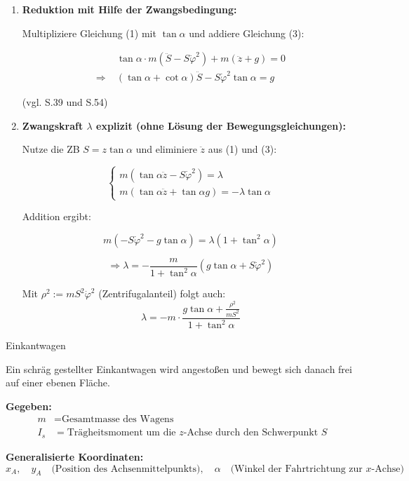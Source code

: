 \documentclass[10pt, letterpaper]{article}
\begin{document}
\begin{enumerate}[label=\textbf{\arabic*)}, itemsep=1.5em]
\item \textbf{Reduktion mit Hilfe der Zwangsbedingung:}

Multipliziere Gleichung (1) mit \( \tan\alpha \) und addiere Gleichung (3):

\begin{align*}
&\tan\alpha \cdot m(\ddot{S} - S \dot{\varphi}^2) + m(\ddot{z} + g) = 0 \\
\Rightarrow \; & (\tan\alpha + \cot\alpha) \ddot{S} - S \dot{\varphi}^2 \tan\alpha = g
\end{align*}

(vgl. S.39 und S.54)

\item \textbf{Zwangskraft \(\lambda\) explizit (ohne Lösung der Bewegungsgleichungen):}

Nutze die ZB \( S = z \tan\alpha \) und eliminiere \( \ddot{z} \) aus (1) und (3):

\[
\begin{cases}
m(\tan\alpha \ddot{z} - S \dot{\varphi}^2) = \lambda \\
m(\tan\alpha \ddot{z} + \tan\alpha g) = -\lambda \tan\alpha
\end{cases}
\]

Addition ergibt:

\[
m(-S \dot{\varphi}^2 - g \tan\alpha) = \lambda (1 + \tan^2\alpha)
\]

\[
\Rightarrow \lambda = -\frac{m}{1 + \tan^2\alpha} \left( g \tan\alpha + S \dot{\varphi}^2 \right)
\]

Mit \( \rho^2 := m S^2 \dot{\varphi}^2 \) (Zentrifugalanteil) folgt auch:
\[
\lambda = -m \cdot \frac{g \tan\alpha + \frac{\rho^2}{m S^2}}{1 + \tan^2\alpha}
\]

\end{enumerate}






Einkantwagen

Ein schräg gestellter Einkantwagen wird angestoßen und bewegt sich danach frei auf einer ebenen Fläche.

\vspace{1em}
\textbf{Gegeben:}
\begin{align*}
m &= \text{Gesamtmasse des Wagens} \\
I_s &= \text{Trägheitsmoment um die } z\text{-Achse durch den Schwerpunkt } S
\end{align*}

\textbf{Generalisierte Koordinaten:}
\[
x_A, \quad y_A \quad \text{(Position des Achsenmittelpunkts)}, 
\quad \alpha \quad \text{(Winkel der Fahrtrichtung zur } x\text{-Achse)}
\]
\end{document}
